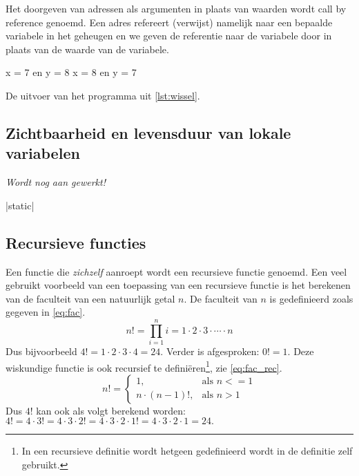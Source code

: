 Het doorgeven van adressen als argumenten in plaats van waarden wordt call by reference genoemd.
Een adres refereert (verwijst) namelijk naar een bepaalde variabele in het geheugen en we geven de referentie naar de variabele door in plaats van de waarde van de variabele.


\begin{myFigure}[!htbp]
	\centering%
	\begin{coutput}
x = 7 en y = 8
x = 8 en y = 7
	\end{coutput}
	\caption{De uitvoer van het programma uit \cref{lst:wissel}.}
	\label{fig:wissel}
\end{myFigure}


\subsection{Zichtbaarheid en levensduur van lokale variabelen}
\emph{Wordt nog aan gewerkt!}

|static|

\subsection{Recursieve functies}
Een functie die \emph{zichzelf} aanroept wordt een recursieve functie genoemd.
Een veel gebruikt voorbeeld van een toepassing van een recursieve functie is het berekenen van de faculteit van een natuurlijk getal $n$.
De faculteit van $n$ is gedefinieerd zoals gegeven in \cref{eq:fac}.
\begin{equation}
\label{eq:fac}
	n! = \prod_{i=1}^{n} i = 1 \cdot{} 2 \cdot{} 3 \cdot{} \cdots{} \cdot{} n
\end{equation} 
Dus bijvoorbeeld $4! = 1 \cdot{} 2 \cdot{} 3 \cdot 4 = 24$.
Verder is afgesproken: $0! = 1$.
Deze wiskundige functie is ook recursief te definiëren\footnote{%
	In een recursieve definitie wordt hetgeen gedefinieerd wordt in de definitie zelf gebruikt.
}, zie \cref{eq:fac_rec}.
\begin{equation}
\label{eq:fac_rec}
	n! =
	\begin{cases}
		1, & \text{als $n <= 1$}\\
		n \cdot{} (n - 1)!, & \text{als $n > 1$}
	\end{cases}
\end{equation} 
Dus $4!$ kan ook als volgt berekend worden: $4! = 4 \cdot{} 3! = 4 \cdot{} 3 \cdot{} 2! = 4 \cdot{} 3 \cdot{} 2 \cdot 1! = 4 \cdot{} 3 \cdot{} 2 \cdot 1 = 24.$

